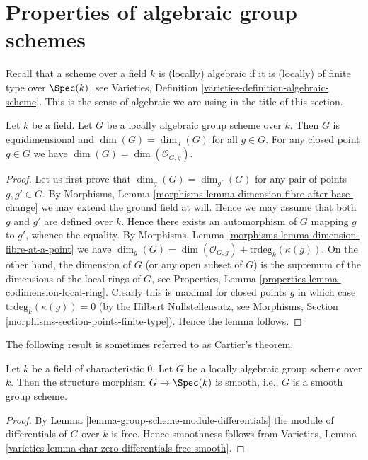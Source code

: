 \section{Properties of algebraic group schemes}
\label{section-algebraic-group-schemes}

\noindent
Recall that a scheme over a field $k$ is (locally) algebraic if it is
(locally) of finite type over $\Spec(k)$, see
Varieties, Definition \ref{varieties-definition-algebraic-scheme}.
This is the sense of algebraic we are using in the title of this section.

\begin{lemma}
\label{lemma-group-scheme-finite-type-field}
Let $k$ be a field. Let $G$ be a locally algebraic group scheme over $k$.
Then $G$ is equidimensional and $\dim(G) = \dim_g(G)$ for all $g \in G$.
For any closed point $g \in G$ we have $\dim(G) = \dim(\mathcal{O}_{G, g})$.
\end{lemma}

\begin{proof}
Let us first prove that $\dim_g(G) = \dim_{g'}(G)$ for any
pair of points $g, g' \in G$. By
Morphisms, Lemma \ref{morphisms-lemma-dimension-fibre-after-base-change}
we may extend the ground field at will. Hence we may assume that
both $g$ and $g'$ are defined over $k$. Hence there exists an
automorphism of $G$ mapping $g$ to $g'$, whence the equality.
By
Morphisms, Lemma \ref{morphisms-lemma-dimension-fibre-at-a-point}
we have
$\dim_g(G) = \dim(\mathcal{O}_{G, g}) +
\text{trdeg}_k(\kappa(g))$.
On the other hand, the dimension of $G$ (or any open subset of $G$)
is the supremum of the dimensions of the local rings of $G$, see
Properties, Lemma \ref{properties-lemma-codimension-local-ring}.
Clearly this is maximal for closed points $g$ in which case
$\text{trdeg}_k(\kappa(g)) = 0$ (by the Hilbert Nullstellensatz, see
Morphisms, Section \ref{morphisms-section-points-finite-type}).
Hence the lemma follows.
\end{proof}

\noindent
The following result is sometimes referred to as Cartier's theorem.

\begin{lemma}
\label{lemma-group-scheme-characteristic-zero-smooth}
Let $k$ be a field of characteristic $0$. Let $G$ be a
locally algebraic group scheme over $k$. Then the structure
morphism $G \to \Spec(k)$ is smooth, i.e., $G$ is a smooth
group scheme.
\end{lemma}

\begin{proof}
By
Lemma \ref{lemma-group-scheme-module-differentials}
the module of differentials of $G$ over $k$ is free.
Hence smoothness follows from
Varieties, Lemma \ref{varieties-lemma-char-zero-differentials-free-smooth}.
\end{proof}

